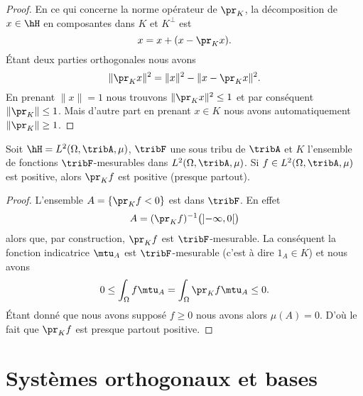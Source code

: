 \begin{proof}
    En ce qui concerne la norme opérateur de \( \pr_K\), la décomposition de \( x\in\hH\) en composantes dans \( K\) et \( K^{\perp}\) est
    \begin{equation}
        x=x+(x-\pr_Kx).
    \end{equation}
    Étant deux parties orthogonales nous avons
    \begin{equation}
        \| \pr_Kx \|^2=\| x \|^2-\| x-\pr_Kx \|^2.
    \end{equation}
    En prenant \( \| x \|=1\) nous trouvons \( \| \pr_Kx \|^2\leq 1\) et par conséquent \( \| \pr_K \|\leq 1\). Mais d'autre part en prenant \( x\in K\) nous avons automatiquement \( \| \pr_K \|\geq 1\).
\end{proof}

\begin{proposition}
    Soit \( \hH=L^2(\Omega,\tribA,\mu)\), \( \tribF\) une sous tribu de \( \tribA\) et \( K\) l'ensemble de fonctions \( \tribF\)-mesurables dans \( L^2(\Omega,\tribA,\mu)\). Si \( f\in L^2(\Omega,\tribA,\mu)\) est positive, alors \( \pr_Kf\) est positive (presque partout).
\end{proposition}

\begin{proof}
    L'ensemble \( A=\{ \pr_Kf<0 \}\) est dans \( \tribF\). En effet 
    \begin{equation}
        A=(\pr_Kf)^{-1}\big( \mathopen] -\infty , 0 \mathclose[\big)
    \end{equation}
    alors que, par construction, \( \pr_Kf\) est \( \tribF\)-mesurable. La conséquent la fonction indicatrice \( \mtu_A\) est \( \tribF\)-mesurable (c'est à dire \( 1_A\in K\)) et nous avons
    \begin{equation}
        0\leq\int_{\Omega}f\mtu_A=\int_{\Omega}\pr_Kf\mtu_A\leq 0.
    \end{equation}
    Étant donné que nous avons supposé \( f\geq 0\) nous avons alors \( \mu(A)=0\). D'où le fait que \( \pr_Kf\) est presque partout positive.
\end{proof}


\section{Systèmes orthogonaux et bases}

